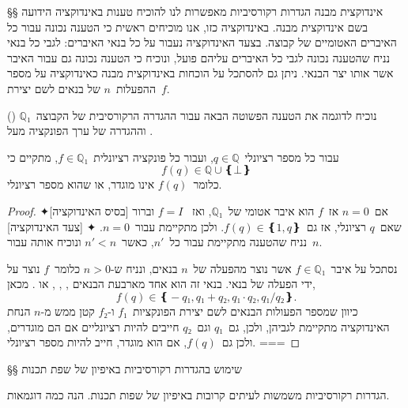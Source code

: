 §§ אינדוקצית מבנה
הגדרות רקורסיביות מאפשרות לנו להוכיח טענות באינדוקציה הידועה בשם אינדוקצית
מבנה. באינדוקציה כזו, אנו מוכיחים ראשית כי הטענה נכונה עבור כל האיברים האטומיים
של קבוצה. בצעד האינדוקציה נעבור על כל בנאי האיברים: לגבי כל בנאי נניח שהטענה
נכונה לגבי כל האיברים עליהם פועל, ונוכיח כי הטענה נכונה גם עבור האיבר אשר אותו
יצר הבנאי. ניתן גם להסתכל על הוכחות באינדוקצית מבנה כאינדוקציה על מספר
ההפעלות~$n$ של בנאים לשם יצירת~$f$.

נוכיח לדוגמה את הטענה הפשוטה הבאה עבור ההגדרה הרקורסיבית של הקבוצה~$ℚ₁$
() וההגדרה של ערך הפונקציה מעל .

\begin{טענה}
  עבור כל מספר רציונלי~$q∈ℚ$, ועבור כל פונקציה רציונלית~$f∈ℚ₁$, מתקיים כי
  \begin{equation}\label{eq:Q}
    f(q)∈ℚ∪❴⊥❵
  \end{equation}
  כלומר~$f(q)$ אינו מוגדר, או שהוא מספר רציונלי.
\end{טענה}

\begin{proof}
  \mbox{}
  ✦[בסיס האינדוקציה] אם~$n=0$ אז~$f$ הוא איבר אטומי של~$ℚ₁$, ואז~%
  $f=I$ וברור שאם~$q$ רציונלי, אז גם~$f(q)∈❴1,q❵$. ולכן 
  מתקיימת עבור~$n=0$.
  ✦ [צעד האינדוקציה] נניח שהטענה  מתקיימת עבור כל~$n'$, כאשר~$n'<n$
  ונוכיח אותה עבור~$n$.

  נסתכל על איבר~$f∈ℚ₁$ אשר נוצר מהפעלה של~$n$ בנאים, ונניח ש-$n>0$ כלומר~$f$
  נוצר על ידי הפעלה של בנאי. בנאי זה הוא אחד מארבעת הבנאים ,
  , , או .
  מכאן, \[
    f(q)∈❴-q₁,q₁+q₂,q₁·q₂,q₁/q₂❵.
\] כיוון שמספר הפעולות הבנאים לשם יצירת הפונקציות~$f₁$ ו-$f₂$ קטן ממש מ-$n$
  הנחת האינדוקציה מתקיימת לגביהן, ולכן, גם~$q₁$ וגם~$q₂$ חייבים להיות רציונליים
  אם הם מוגדרים, ולכן גם~$f(q)$, אם הוא מוגדר, חייב להיות מספר רציונלי.
===
\end{proof}

§§ שימוש בהגדרות רקורסיביות באיפיון של שפת תכנות

הגדרות רקורסיביות משמשות לעיתים קרובות באיפיון של שפות תכנות.
הנה כמה דוגמאות.

